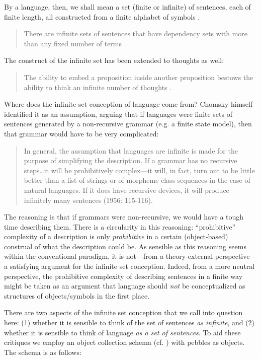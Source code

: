 By a language, then, we shall mean a set (finite or infinite) of sentences, each of finite length, all constructed from a finite alphabet of symbols \citep[114]{Chomsky1956}.

\begin{quote}
    There are infinite sets of sentences that have dependency sets with more than any fixed number of terms \citep[115]{Chomsky1956}. 
    \end{quote}

The construct of the infinite set has been extended to thoughts as well:

\begin{quote}
The ability to embed a proposition inside another proposition bestows the ability to think an infinite number of thoughts \citep[125]{Pinker1999}. 
\end{quote}

  Where does the infinite set conception of language come from? Chomsky himself identified it as an assumption, arguing that if languages were finite sets of sentences generated by a non-recursive grammar (e.g. a finite state model), then that grammar would have to be very complicated:
  
\begin{quote}
In general, the assumption that languages are infinite is made for the purpose of simplifying the description. If a grammar has no recursive steps…it will be prohibitively complex—it will, in fact, turn out to be little better than a list of strings or of morpheme class sequences in the case of natural languages. If it does have recursive devices, it will produce infinitely many sentences (1956: 115-116).
\end{quote}

  The reasoning is that if grammars were non-recursive, we would have a tough time describing them. There is a circularity in this reasoning: “prohibitive” complexity of a description is only \textit{prohibitive} in a certain (object-based) construal of what the description could be. As sensible as this reasoning seems within the conventional paradigm, it is not—from a theory-external perspective—a satisfying argument for the infinite set conception. Indeed, from a more neutral perspective, the prohibitive complexity of describing sentences in a finite way might be taken as an argument that language should \textit{not} be conceptualized as structures of objects/symbols in the first place.

  There are two aspects of the infinite set conception that we call into question here: 
  (1) whether it is sensible to think of the set of sentences \textit{as infinite}, and 
  (2) whether it is sensible to think of language \textit{as a set of sentences}. To aid these critiques we employ an object collection schema (cf. \citealt{LakoffNúñez2000}) with pebbles as objects. The schema is as follows: 

